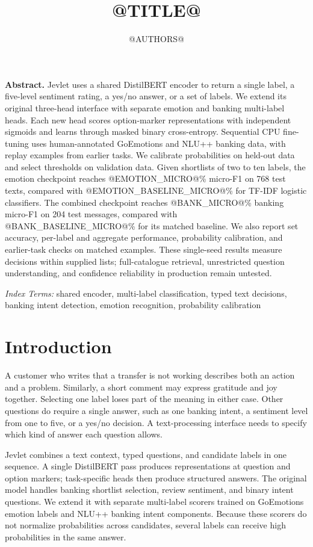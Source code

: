 \documentclass[conference]{IEEEtran}
\title{@TITLE@}
\author{@AUTHORS@}
\renewenvironment{abstract}{\par\noindent\normalfont\normalsize\textbf{Abstract.}\enspace\ignorespaces}{\par\vspace{0.6\baselineskip}}
\renewenvironment{IEEEkeywords}{\par\noindent\normalfont\small\textit{Index Terms:}\enspace\ignorespaces}{\par\vspace{0.6\baselineskip}}
\begin{document}
\maketitle

\begin{abstract}
Jevlet uses a shared DistilBERT encoder to return a single label, a five-level sentiment rating, a yes/no answer, or a set of labels. We extend its original three-head interface with separate emotion and banking multi-label heads. Each new head scores option-marker representations with independent sigmoids and learns through masked binary cross-entropy. Sequential CPU fine-tuning uses human-annotated GoEmotions and NLU++ banking data, with replay examples from earlier tasks. We calibrate probabilities on held-out data and select thresholds on validation data. Given shortlists of two to ten labels, the emotion checkpoint reaches @EMOTION_MICRO@\% micro-F1 on 768 test texts, compared with @EMOTION_BASELINE_MICRO@\% for TF-IDF logistic classifiers. The combined checkpoint reaches @BANK_MICRO@\% banking micro-F1 on 204 test messages, compared with @BANK_BASELINE_MICRO@\% for its matched baseline. We also report set accuracy, per-label and aggregate performance, probability calibration, and earlier-task checks on matched examples. These single-seed results measure decisions within supplied lists; full-catalogue retrieval, unrestricted question understanding, and confidence reliability in production remain untested.
\end{abstract}
\begin{IEEEkeywords}
shared encoder, multi-label classification, typed text decisions, banking intent detection, emotion recognition, probability calibration
\end{IEEEkeywords}

\section{Introduction}
A customer who writes that a transfer is not working describes both an action and a problem. Similarly, a short comment may express gratitude and joy together. Selecting one label loses part of the meaning in either case. Other questions do require a single answer, such as one banking intent, a sentiment level from one to five, or a yes/no decision. A text-processing interface needs to specify which kind of answer each question allows.

Jevlet combines a text context, typed questions, and candidate labels in one sequence. A single DistilBERT pass produces representations at question and option markers; task-specific heads then produce structured answers. The original model handles banking shortlist selection, review sentiment, and binary intent questions. We extend it with separate multi-label scorers trained on GoEmotions emotion labels and NLU++ banking intent components. Because these scorers do not normalize probabilities across candidates, several labels can receive high probabilities in the same answer.
\end{document}

